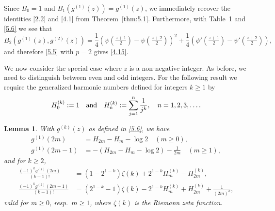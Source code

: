 \documentclass{amsart}
\newtheorem{lemma}[theorem]{Lemma}
\theoremstyle{definition}
\theoremstyle{remark}
\numberwithin{equation}{section}
\begin{document}
Since $B_0=1$ and $B_1(g^{(1)}(z))=g^{(1)}(z)$, we immediately recover the
identities \eqref{2.2} and \eqref{4.1} from Theorem~\ref{thm:5.1}. Furthermore,
with Table~1 and \eqref{5.6} we see that
\[
B_2(g^{(1)}(z),g^{(2)}(z))=
\frac{1}{4}\left(\psi(\tfrac{z+1}{2})-\psi(\tfrac{z+2}{2})\right)^2
+\frac{1}{4}\left(\psi'(\tfrac{z+1}{2})-\psi'(\tfrac{z+2}{2})\right),
\]
and therefore \eqref{5.5} with $p=2$ gives \eqref{4.15}.

We now consider the special case where $z$ is a non-negative integer. As 
before, we need to distinguish between even and odd integers. For the following
result we require the generalized harmonic numbers defined for integers
$k\geq 1$ by
\begin{equation}\label{5.12}
H_0^{(k)}:=1\quad\hbox{and}\quad H_n^{(k)}:=\sum_{j=1}^n\frac{1}{j^k},\quad 
n=1, 2, 3,\ldots.
\end{equation}

\begin{lemma}\label{lem:5.2}
With $g^{(k)}(z)$ as defined in \eqref{5.6}, we have
\begin{align}
g^{(1)}(2m) &= H_{2m}-H_m-\log{2}\quad (m\geq 0),\label{5.13} \\
g^{(1)}(2m-1) &= -\left(H_{2m}-H_m-\log{2}\right)-\frac{1}{2m}\quad (m\geq 1),
\label{5.14}
\end{align}
and for $k\geq 2$,
\begin{align}
\frac{(-1)^kg^{(k)}(2m)}{(k-1)!}&=(1-2^{1-k})\zeta(k)
+2^{1-k}H_m^{(k)}-H_{2m}^{(k)},\label{5.15}\\
\frac{(-1)^kg^{(k)}(2m-1)}{(k-1)!}&=(2^{1-k}-1)\zeta(k)
-2^{1-k}H_m^{(k)}+H_{2m}^{(k)}+\frac{1}{(2m)^k},
\label{5.16}
\end{align}
valid for $m\geq 0$, resp.\ $m\geq 1$, where $\zeta(k)$ is the Riemann zeta 
function.
\end{lemma}
\end{document}
